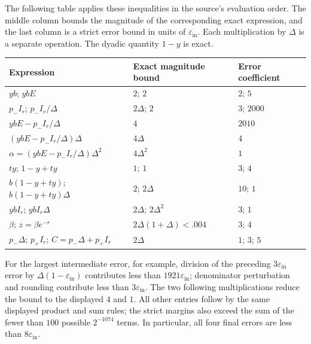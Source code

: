 The following table applies these inequalities in the source's evaluation
order.  The middle column bounds the magnitude of the corresponding exact
expression, and the last column is a strict error bound in units of
$\varepsilon_{\mathrm{in}}$.  Each multiplication by $\Delta$ is a
separate operation.  The dyadic quantity $1-y$ is exact.
\begin{center}
\small
\begin{tabular}{lll}
\hline
Expression & Exact magnitude bound & Error coefficient\\
\hline
$yb$; $ybE$ & $2$; $2$ & $2$; $5$\\
$p_-I_r$; $p_-I_r/\Delta$ & $2\Delta$; $2$ & $3$; $2000$\\
$ybE-p_-I_r/\Delta$ & $4$ & $2010$\\
$(ybE-p_-I_r/\Delta)\Delta$ & $4\Delta$ & $4$\\
$\alpha=(ybE-p_-I_r/\Delta)\Delta^2$ & $4\Delta^2$ & $1$\\
$ty$; $1-y+ty$ & $1$; $1$ & $3$; $4$\\
$b(1-y+ty)$; $b(1-y+ty)\Delta$ & $2$; $2\Delta$ & $10$; $1$\\
$ybI_r$; $ybI_r\Delta$ & $2\Delta$; $2\Delta^2$ & $3$; $1$\\
$\beta$; $z=\beta e^{-r}$ & $2\Delta(1+\Delta)<.004$ & $3$; $4$\\
$p_-\Delta$; $p_+I_r$; $C=p_-\Delta+p_+I_r$ & $2\Delta$ & $1$; $3$; $5$\\
\hline
\end{tabular}
\end{center}
For the largest intermediate error, for example, division of the preceding
$3\varepsilon_{\mathrm{in}}$ error by
$\Delta(1-\varepsilon_{\mathrm{in}})$ contributes less than
$1921\varepsilon_{\mathrm{in}}$; denominator perturbation and rounding
contribute less than $3\varepsilon_{\mathrm{in}}$.  The two following
multiplications reduce the bound to the displayed $4$ and $1$.
All other entries follow by the same displayed product and sum rules;
the strict margins also exceed the sum of the fewer than $100$ possible
$2^{-1074}$ terms.  In particular, all four final errors are less than
$8\varepsilon_{\mathrm{in}}$.

